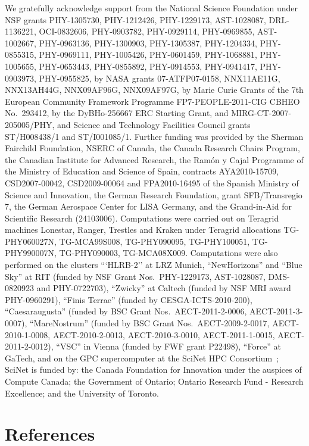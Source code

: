 \documentclass[12pt]{iopart}
\begin{document}
We gratefully acknowledge support from the National Science Foundation
under NSF grants
PHY-1305730, %
PHY-1212426, %
PHY-1229173, %
AST-1028087, %
DRL-1136221, %
OCI-0832606, %
PHY-0903782, %
PHY-0929114, %
PHY-0969855, %
AST-1002667, %
PHY-0963136, %
PHY-1300903, %
PHY-1305387, %
PHY-1204334, %
PHY-0855315, %
PHY-0969111, %
PHY-1005426, %
PHY-0601459, %
PHY-1068881, %
PHY-1005655, %
PHY-0653443, %
PHY-0855892, %
PHY-0914553, %
PHY-0941417, %
PHY-0903973, %
PHY-0955825, %
by NASA grants 
07-ATFP07-0158, %
NNX11AE11G, %
NNX13AH44G, %
NNX09AF96G, %
NNX09AF97G, %
by Marie Curie Grants of the 7th European Community Framework Programme
FP7-PEOPLE-2011-CIG CBHEO No.~293412,
by the DyBHo-256667 ERC Starting Grant, %
and
MIRG-CT-2007-205005/PHY, %
and Science and Technology Facilities Council grants ST/H008438/1
and ST/I001085/1.
Further funding was provided by
the Sherman Fairchild Foundation, %
NSERC of Canada,  %
the Canada Research Chairs Program, %
the Canadian Institute for Advanced Research, %
the Ram{\'o}n y Cajal Programme of the Ministry of Education and Science of 
Spain, %
contracts AYA2010-15709, CSD2007-00042, CSD2009-00064 and FPA2010-16495 of the 
Spanish Ministry of Science and Innovation, %
the German Research Foundation, grant SFB/Transregio 7, %
the German Aerospace Center for LISA Germany, %
and the Grand-in-Aid for Scientific Research (24103006). %
Computations were carried out on Teragrid machines Lonestar, Ranger,
Trestles and Kraken under Teragrid allocations 
%
TG-PHY060027N, %
TG-MCA99S008, %
TG-PHY090095, %
TG-PHY100051, %
TG-PHY990007N, %
TG-PHY090003,  %
TG-MCA08X009. %
%
Computations were also performed on the clusters 
```HLRB-2'' at LRZ Munich,
``NewHorizons'' and ``Blue Sky'' at RIT (funded by NSF Grant Nos.~PHY-1229173, 
AST-1028087, DMS-0820923 and PHY-0722703), 
``Zwicky'' at Caltech (funded by NSF MRI award PHY-0960291),
``Finis Terrae'' (funded by CESGA-ICTS-2010-200),
``Caesaraugusta'' (funded by BSC Grant Nos.~AECT-2011-2-0006, AECT-2011-3-0007),
``MareNostrum''  (funded by BSC Grant Nos.~AECT-2009-2-0017, AECT-2010-1-0008, 
AECT-2010-2-0013, AECT-2010-3-0010, AECT-2011-1-0015, AECT-2011-2-0012),
``VSC'' in Vienna (funded by FWF grant P22498),
``Force'' at GaTech, 
and on the GPC supercomputer at the SciNet HPC Consortium~\cite{Loken:2010}; 
SciNet is
funded by: the Canada Foundation for Innovation under the auspices of
Compute Canada; the Government of Ontario; Ontario Research Fund -
Research Excellence; and the University of Toronto.

\section*{References}

\end{document}
